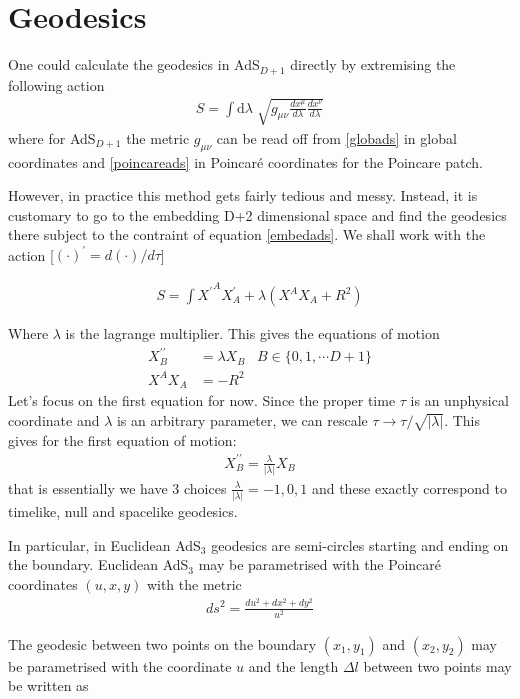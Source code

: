 \section{Geodesics} \label{adsgeodesic}
One could calculate the geodesics in AdS$_{D+1}$ directly by extremising the following action
\begin{align}
 S= \int \mathrm{d} \lambda \; \sqrt{g_{\mu \nu} {\frac{dx^\mu}{d\lambda}} {\frac{dx^\nu}{d\lambda}} }
\end{align}
where for AdS$_{D+1}$ the metric $g_{\mu\nu}$ can be read off from \ref{globads} in global coordinates and \ref{poincareads} in Poincar\'{e} coordinates for the Poincare patch.

However, in practice this method gets fairly tedious and messy. Instead, it is customary to go to the embedding D+2 dimensional space and find the geodesics there subject to the contraint of equation \ref{embedads}. We shall work with the action [$(\cdot)^\prime = d(\cdot)/d\tau$]

\begin{align}
 S = \int {X^\prime}^A X^\prime_A + \lambda (X^A X_A + R^2 )
\end{align}

Where $\lambda$ is the lagrange multiplier. This gives the equations of motion
\begin{align}
 X_B^{\prime\prime} &= \lambda X_B \; \;\; B \in \{0,1,\cdots D+1 \} \\
 X^A X_A &= -R^2 
\end{align}
Let's focus on the first equation for now. Since the proper time $\tau$ is an unphysical coordinate and $\lambda$ is an arbitrary parameter, we can rescale $\tau \to \tau/\sqrt{|\lambda|}$. This gives for the first equation of motion:
\begin{align}
 X_B^{\prime\prime} = \frac{\lambda}{|\lambda|} X_B 
\end{align}
that is essentially we have 3 choices $\frac{\lambda}{|\lambda|} = -1, 0, 1$ and these exactly correspond to timelike, null and spacelike geodesics.

In particular, in Euclidean AdS$_3$ geodesics are semi-circles starting and ending on the boundary. Euclidean AdS$_3$ may be parametrised with the Poincar\'{e} coordinates $(u,x,y)$ with the metric
\begin{align}
 ds^2 = \frac{du^2 + dx^2 + dy^2}{u^2} 
\end{align}

The geodesic between two points on the boundary $(x_1,y_1)$ and $(x_2,y_2)$ may be parametrised with the coordinate $u$ and the length $\Delta l$ between two points may be written as 

